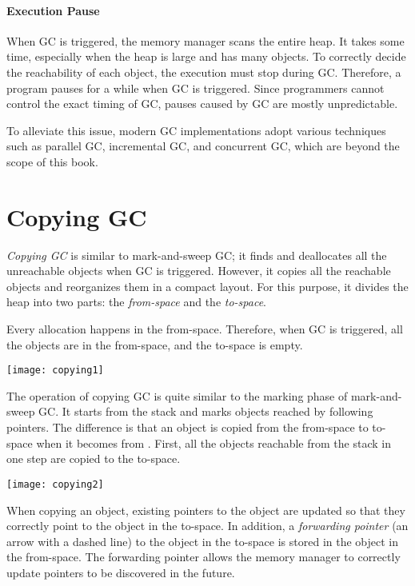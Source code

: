 \paragraph{Execution Pause}

When GC is triggered, the memory manager scans the entire heap. It takes some
time, especially when the heap is large and has many objects. To correctly decide
the reachability of each object, the execution must stop during GC. Therefore,
a program pauses for a while when GC is triggered. Since programmers cannot
control the exact timing of GC, pauses caused by GC are mostly unpredictable.

To alleviate this issue, modern GC implementations adopt various techniques such
as parallel GC, incremental GC, and concurrent GC, which are beyond the scope of
this book.

\section{Copying GC}

\textit{Copying GC} is similar to
mark-and-sweep GC; it finds and deallocates all the unreachable objects when GC
is triggered. However, it copies all the reachable objects and reorganizes them in
a compact layout. For this purpose, it divides the heap into two parts: the
\textit{from-space} and the \textit{to-space}.

Every allocation happens in the from-space. Therefore, when GC is triggered,
all the objects are in the from-space, and the to-space is empty.

\begin{center}
\texttt{[image: copying1]}
\end{center}

The operation of copying GC is quite similar to the marking phase of
mark-and-sweep GC. It starts from the stack and marks objects reached by following
pointers. The difference is that an object is copied from the from-space to
to-space when it becomes \uscn from \urch. First, all the objects
reachable from the stack in one step are copied to the to-space.

\begin{center}
\texttt{[image: copying2]}
\end{center}

When copying an object, existing pointers to the object are updated so that
they correctly point to the object in the to-space. In addition, a
\textit{forwarding pointer} (an arrow with a dashed
line) to the object in the to-space is stored in the object in the from-space.
The forwarding pointer allows the memory manager to correctly update pointers
to be discovered in the future.

